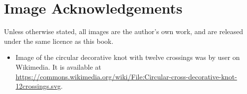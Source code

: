 \chapter{Image Acknowledgements}
Unless otherwise stated, all images are the author's own work, and are released under the same licence as this book.

\begin{itemize}
    \item Image of the circular decorative knot with twelve crossings was by user  on Wikimedia. It is available at \url{https://commons.wikimedia.org/wiki/File:Circular-cross-decorative-knot-12crossings.svg}.
\end{itemize}
